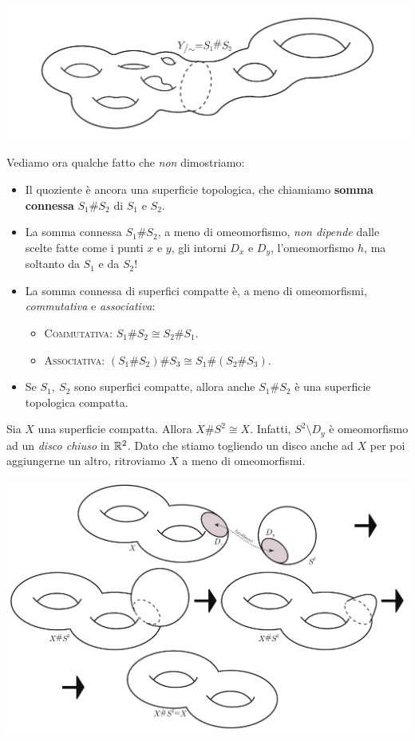 \begin{center}
	\includegraphics[trim=0cm 0cm 0cm 0cm, clip, scale=0.4]{images/connectedsum3.pdf}
\end{center}
Vediamo ora qualche fatto che \textit{non} dimostriamo:
	\begin{itemize}
		\item Il quoziente è ancora una superficie topologica, che chiamiamo \textbf{somma connessa} $S_1\# S_2$  di $S_1$ e $S_2$.
		\item La somma connessa $S_1\# S_2$, a meno di omeomorfismo, \textit{non dipende} dalle scelte fatte come i punti $x$ e $y$, gli intorni $D_x$ e $D_y$, l'omeomorfismo $h$, ma soltanto da $S_1$ e da $S_2$!
		\item La somma connessa di superfici compatte è, a meno di omeomorfismi, \textit{commutativa} e \textit{associativa}:
		\begin{itemize}
			\item \textsc{Commutativa}: $S_1\# S_2\cong S_2\# S_1$.
			\item \textsc{Associativa}: $\left(S_1\# S_2\right)\# S_3\cong S_1\#\left(S_2\# S_3\right)$.
		\end{itemize}
	\item Se $S_1,\ S_2$ sono superfici compatte, allora anche $S_1\# S_2$ è una superficie topologica compatta.
	\end{itemize}
\begin{observe}
	Sia $X$ una superficie compatta. Allora $X\# S^2\cong X$. Infatti, $S^2\setminus D_y$ è omeomorfismo ad un \textit{disco chiuso} in $\mathbb{R}^2$. Dato che stiamo togliendo un disco anche ad $X$ per poi aggiungerne un altro, ritroviamo $X$ a meno di omeomorfismi.
	\begin{center}
		\includegraphics[trim=0cm 0cm 0cm 0cm, clip, scale=0.4]{images/connectedsumsphere.pdf}
	\end{center}
\vspace{-6mm}
\end{observe}
